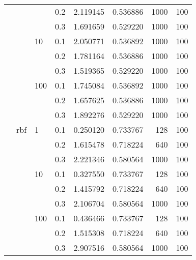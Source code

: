 \begin{table}[H]
\begin{tabular}{llllrrrr}
           &     &     & 0.2 &  2.119145 &  0.536886 &    1000 &   100 \\
           &     &     & 0.3 &  1.691659 &  0.529220 &    1000 &   100 \\
           &     & 10  & 0.1 &  2.050771 &  0.536892 &    1000 &   100 \\
           &     &     & 0.2 &  1.781164 &  0.536886 &    1000 &   100 \\
           &     &     & 0.3 &  1.519365 &  0.529220 &    1000 &   100 \\
           &     & 100 & 0.1 &  1.745084 &  0.536892 &    1000 &   100 \\
           &     &     & 0.2 &  1.657625 &  0.536886 &    1000 &   100 \\
           &     &     & 0.3 &  1.892276 &  0.529220 &    1000 &   100 \\
           & rbf & 1   & 0.1 &  0.250120 &  0.733767 &     128 &   100 \\
           &     &     & 0.2 &  1.615478 &  0.718224 &     640 &   100 \\
           &     &     & 0.3 &  2.221346 &  0.580564 &    1000 &   100 \\
           &     & 10  & 0.1 &  0.327550 &  0.733767 &     128 &   100 \\
           &     &     & 0.2 &  1.415792 &  0.718224 &     640 &   100 \\
           &     &     & 0.3 &  2.106704 &  0.580564 &    1000 &   100 \\
           &     & 100 & 0.1 &  0.436466 &  0.733767 &     128 &   100 \\
           &     &     & 0.2 &  1.515308 &  0.718224 &     640 &   100 \\
           &     &     & 0.3 &  2.907516 &  0.580564 &    1000 &   100 \\
\bottomrule
\end{tabular}
\end{table}
